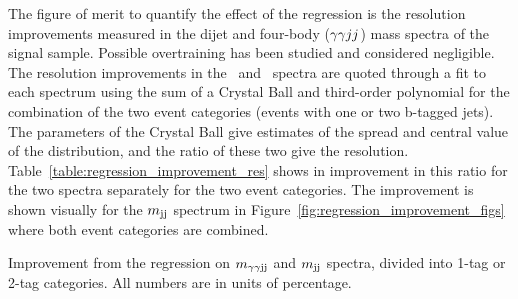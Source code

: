The figure of merit to quantify the effect of the regression is the resolution improvements
measured in the dijet and four-body ($\gamma\gamma jj$) mass spectra of the signal sample.
Possible overtraining has been studied and considered negligible.
The resolution improvements in the \Mjj\, and \Mggjj\, spectra are quoted through a
fit to each spectrum using the sum of a Crystal Ball and third-order polynomial for the combination
of the two event categories (events with one or two b-tagged jets).
The parameters of the Crystal Ball give estimates
of the spread and central value of the distribution, and the ratio of these two give the resolution.
Table~\ref{table:regression_improvement_res} shows in improvement in this ratio for the two spectra
separately for the two event categories. The improvement is shown visually  for the $m_{\rm jj}$ spectrum in
Figure~\ref{fig:regression_improvement_figs} where both event categories are combined.

\begin{table}[ht]
  \centering
  \renewcommand{\arraystretch}{1.4}
  \caption{Improvement from the regression on $m_{\gamma\gamma {\rm jj}}$ and $m_{\rm jj}$ spectra, divided into 1-tag or 2-tag
categories. All numbers are in units of percentage.}
  
  \label{table:regression_improvement_res}
\end{table}

